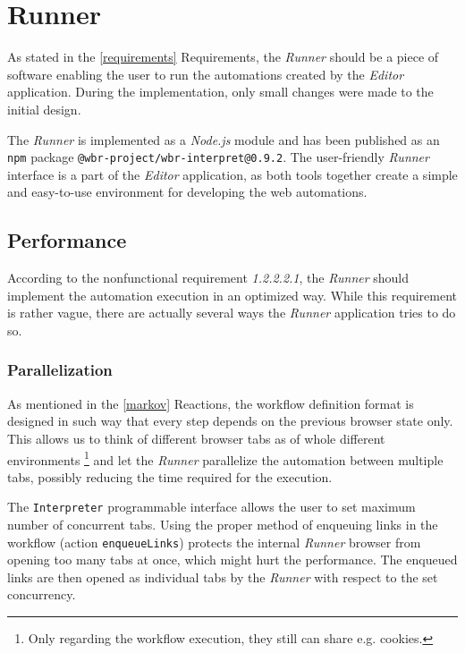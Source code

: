 \section{Runner}
As stated in the \autoref{requirements} Requirements, the \textit{Runner} should be a piece of software enabling the user to run the automations created by the \textit{Editor} application.
During the implementation, only small changes were made to the initial design.

The \textit{Runner} is implemented as a \textit{Node.js} module and has been published as an \texttt{npm} package \texttt{@wbr-project/wbr-interpret@0.9.2}.
The user-friendly \textit{Runner} interface is a part of the \textit{Editor} application, as both tools together create a simple and easy-to-use environment for developing the web automations.

\subsection{Performance}

According to the nonfunctional requirement \textit{1.2.2.2.1}, the \textit{Runner} should implement the automation execution in an optimized way. 
While this requirement is rather vague, there are actually several ways the \textit{Runner} application tries to do so.

\subsubsection{Parallelization}

As mentioned in the \autoref{markov} Reactions, the workflow definition format is designed in such way that every step depends on the previous browser state only. 
This allows us to think of different browser tabs as of whole different environments \footnote{Only regarding the workflow execution, they still can share e.g. cookies.} 
and let the \textit{Runner} parallelize the automation between multiple tabs, possibly reducing the time required for the execution.

The \texttt{Interpreter} programmable interface allows the user to set maximum number of concurrent tabs.
Using the proper method of enqueuing links in the workflow (action \texttt{enqueueLinks}) protects the internal \textit{Runner} browser from opening too many tabs at once, which might hurt the performance.
The enqueued links are then opened as individual tabs by the \textit{Runner} with respect to the set concurrency.

